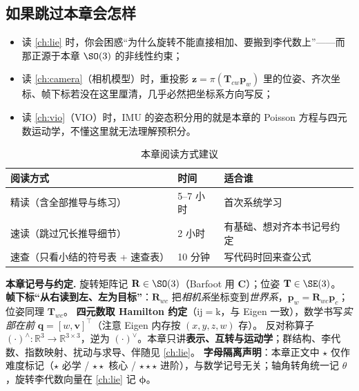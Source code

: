 \subsection*{如果跳过本章会怎样}
\begin{itemize}
  \item 读 \cref{ch:lie} 时，你会困惑“为什么旋转不能直接相加、要搬到李代数上”——而那正源于本章 $\SO(3)$ 的非线性约束；
  \item 读 \cref{ch:camera}（相机模型）时，重投影 $\mathbf{z}=\pi(\mathbf{T}_{cw}\mathbf{p}_w)$ 里的位姿、齐次坐标、帧下标若没在这里厘清，几乎必然把坐标系方向写反；
  \item 读 \cref{ch:vio}（VIO）时，IMU 的姿态积分用的就是本章的 Poisson 方程与四元数运动学，不懂这里就无法理解预积分。
\end{itemize}

\begin{table}[H]\centering\small
\caption{本章阅读方式建议}
\begin{tabular}{lll}
\toprule
阅读方式 & 时间 & 适合谁 \\
\midrule
精读（含全部推导与练习） & 5--7 小时 & 首次系统学习 \\
速读（跳过冗长推导细节） & 2 小时 & 有基础、想对齐本书记号约定 \\
速查（只看小结的符号表 + 速查表） & 10 分钟 & 写代码时回来查公式 \\
\bottomrule
\end{tabular}
\end{table}

\begin{note}
\textbf{本章记号与约定.}\;
旋转矩阵记 $\mathbf{R}\in\SO(3)$（Barfoot\cite{barfoot2024state} 用 $\mathbf{C}$）；位姿 $\mathbf{T}\in\SE(3)$。
\textbf{帧下标“从右读到左、左为目标”}：$\mathbf{R}_{wc}$ 把\emph{相机系}坐标变到\emph{世界系}，$\mathbf{p}_w=\mathbf{R}_{wc}\mathbf{p}_c$；位姿同理 $\mathbf{T}_{wc}$。
\textbf{四元数取 Hamilton 约定}（$\mathrm{ij}=\mathrm{k}$，与 Eigen 一致），数学书写\emph{实部在前} $\mathbf{q}=[w,\mathbf{v}]^\top$（注意 Eigen 内存按 $(x,y,z,w)$ 存）。
反对称算子 $(\cdot)^\wedge:\mathbb{R}^3\to\mathbb{R}^{3\times3}$，逆为 $(\cdot)^\vee$。本章只讲\textbf{表示、互转与运动学}；群结构、李代数、指数映射、扰动与求导、伴随见 \cref{ch:lie}。
\textbf{字母隔离声明}：本章正文中 $\star$ 仅作难度标记（$\star$ 必学 / $\star\star$ 核心 / $\star\star\star$ 进阶），与数学记号无关；轴角转角统一记 $\theta$，旋转李代数向量在 \cref{ch:lie} 记 $\boldsymbol{\phi}$。
\end{note}

